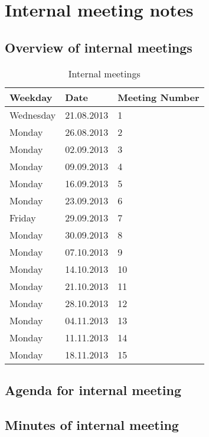 \chapter{Internal meeting notes}
\label{AppendixF}


\section{Overview of internal meetings}

\begin{table}[h]
\begin{center}
\begin{tabular}{ l | l | l }
  \hline
  Weekday & Date & Meeting Number \\
  \hline\noalign{\smallskip}\noalign{\smallskip}\hline
  	Wednesday 	&	21.08.2013 & 1 \\
	Monday		&	26.08.2013 & 2 \\
	Monday		& 	02.09.2013 & 3 \\
	Monday 		&	09.09.2013 & 4 \\
	Monday 		&	16.09.2013 & 5 \\
	Monday 		&	23.09.2013 & 6 \\
	Friday 		&	29.09.2013 & 7 \\
	Monday 		&	30.09.2013 & 8 \\
	Monday 		&	07.10.2013 & 9 \\
	Monday 		&	14.10.2013 & 10 \\
	Monday 		&	21.10.2013 & 11 \\
	Monday 		&	28.10.2013 & 12 \\
	Monday 		&	04.11.2013 & 13 \\
	Monday 		&	11.11.2013 & 14 \\
	Monday 		&	18.11.2013 & 15 \\
  \hline
\end{tabular}
\end{center}
\caption{Internal meetings}
\label{table:internalmeetings}
\end{table}

\section{Agenda for internal meeting}

\section{Minutes of internal meeting}